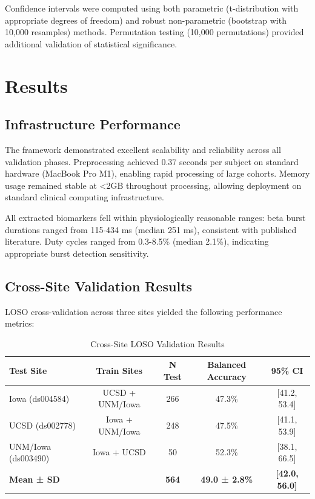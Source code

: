 \documentclass[11pt]{article}
\begin{document}
Confidence intervals were computed using both parametric (t-distribution with appropriate degrees of freedom) and robust non-parametric (bootstrap with 10,000 resamples) methods. Permutation testing (10,000 permutations) provided additional validation of statistical significance.

\section{Results}

\subsection{Infrastructure Performance}

The framework demonstrated excellent scalability and reliability across all validation phases. Preprocessing achieved 0.37 seconds per subject on standard hardware (MacBook Pro M1), enabling rapid processing of large cohorts. Memory usage remained stable at <2GB throughout processing, allowing deployment on standard clinical computing infrastructure.

All extracted biomarkers fell within physiologically reasonable ranges: beta burst durations ranged from 115-434 ms (median 251 ms), consistent with published literature\cite{shin2017dynamics}. Duty cycles ranged from 0.3-8.5\% (median 2.1\%), indicating appropriate burst detection sensitivity.

\subsection{Cross-Site Validation Results}

LOSO cross-validation across three sites yielded the following performance metrics:

\begin{table}[ht]
\centering
\caption{Cross-Site LOSO Validation Results}
\begin{tabular}{lcccc}
\toprule
Test Site & Train Sites & N Test & Balanced Accuracy & 95\% CI \\
\midrule
Iowa (ds004584) & UCSD + UNM/Iowa & 266 & 47.3\% & [41.2, 53.4] \\
UCSD (ds002778) & Iowa + UNM/Iowa & 248 & 47.5\% & [41.1, 53.9] \\
UNM/Iowa (ds003490) & Iowa + UCSD & 50 & 52.3\% & [38.1, 66.5] \\
\midrule
\textbf{Mean ± SD} & & \textbf{564} & \textbf{49.0 ± 2.8\%} & \textbf{[42.0, 56.0]} \\
\bottomrule
\end{tabular}
\end{table}
\end{document}
